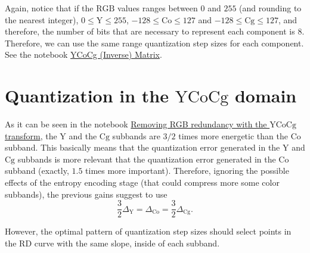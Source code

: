 Again, notice that if the $\text{RGB}$ values ranges between $0$ and
$255$ (and rounding to the nearest integer), $0\le\text{Y}\le 255$,
$-128\le\text{Co}\le 127$ and $-128\le\text{Cg}\le 127$, and
therefore, the number of bits that are necessary to represent each
component is $8$. Therefore, we can use the same range quantization
step sizes for each component. See the notebook
\href{https://github.com/vicente-gonzalez-ruiz/color_transforms/blob/main/docs/YCoCg/notebooks/YCoCg_matrix.ipynb}{YCoCg
  (Inverse) Matrix}.


\section{Quantization in the $\text{YCoCg}$ domain}
As it can be seen in the notebook
\href{https://github.com/vicente-gonzalez-ruiz/color_transforms/blob/main/docs/YCoCg/notebooks/YCoCg_over_RGB.ipynb}{Removing
  RGB redundancy with the $\text{YCoCg}$ transform}, the $\text{Y}$
and the $\text{Cg}$ subbands are $3/2$ times more energetic than the
$\text{Co}$ subband. This basically means that the quantization error
generated in the $\text{Y}$ and $\text{Cg}$ subbands is more relevant
that the quantization error generated in the $\text{Co}$ subband
(exactly, $1.5$ times more important). Therefore, ignoring the
possible effects of the entropy encoding stage (that could compress
more some color subbands), the previous gains suggest to use
\begin{equation}
  \frac{3}{2}\Delta_{\text{Y}} = \Delta_{\text{Co}} = \frac{3}{2}\Delta_{\text{Cg}}.
\end{equation}

However, the optimal pattern of quantization step sizes should select
points in the RD curve with the same slope, inside of each subband.

